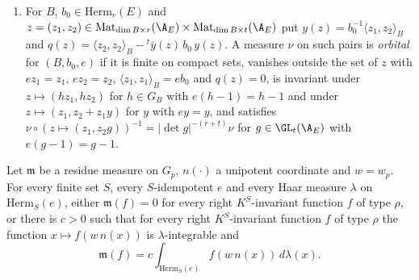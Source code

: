 \begin{definition}
\begin{enumerate}[label=(\alph*)]
\emph{cell} $(\Omega,\tau,w,n)$ consists of an open left $P$-stable set $\Omega$, a continuous additive map $n$ from a locally compact group $N$ to $G$
and a continuous map $\tau:\Omega\to N$ with $\tau(qx)=\tau(x)$ for $q\in P$, $xn(y)\in\Omega$ and $\tau(xn(y))=\tau(x)+y$.
\item For $B$, $b_0\in\mathrm{Herm}_r(E)$ and $z=(z_1,z_2)\in\mathrm{Mat}_{\dim B\times r}(\A_E)\times\mathrm{Mat}_{\dim B\times t}(\A_E)$ put
$y(z)=b_0^{-1}\langle z_1,z_2\rangle_B$ and $q(z)=\langle z_2,z_2\rangle_B-{}^t\bar y(z)\,b_0\,y(z)$. A measure $\nu$ on such pairs is
\emph{orbital} for $(B,b_0,e)$ if it is finite on compact sets, vanishes outside the set of $z$ with $ez_1=z_1$, $ez_2=z_2$, $\langle z_1,z_1\rangle_B=eb_0$ and
$q(z)=0$, is invariant under $z\mapsto(hz_1,hz_2)$ for $h\in G_B$ with $e(h-1)=h-1$ and under $z\mapsto(z_1,z_2+z_1y)$ for $y$ with $ey=y$, and
satisfies $\nu\circ(z\mapsto(z_1,z_2g))^{-1}=|\det g|^{-(r+t)}\nu$ for $g\in\GL_t(\A_E)$ with $e(g-1)=g-1$.
\end{enumerate}
\end{definition}

\begin{proposition}\label{pf:liftinj:mucell}
Let $\mathfrak m$ be a residue measure on $G_p$, $n(\cdot)$ a unipotent coordinate and $w=w_p$. For every finite set $S$, every $S$-idempotent $e$ and
every Haar measure $\lambda$ on $\mathrm{Herm}_S(e)$, either $\mathfrak m(f)=0$ for every right $K^S$-invariant function $f$ of type $\rho$, or there is
$c>0$ such that for every right $K^S$-invariant function $f$ of type $\rho$ the function $x\mapsto f(w\,n(x))$ is $\lambda$-integrable and
\[
\mathfrak m(f)=c\int_{\mathrm{Herm}_S(e)}f(w\,n(x))\,d\lambda(x).
\]
\end{proposition}

